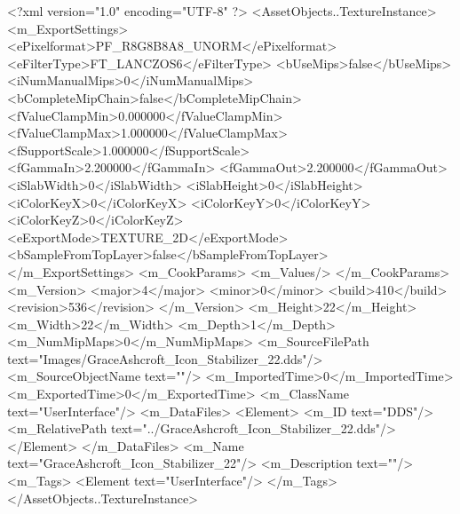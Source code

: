 <?xml version="1.0" encoding="UTF-8" ?>
<AssetObjects..TextureInstance>
	<m_ExportSettings>
		<ePixelformat>PF_R8G8B8A8_UNORM</ePixelformat>
		<eFilterType>FT_LANCZOS6</eFilterType>
		<bUseMips>false</bUseMips>
		<iNumManualMips>0</iNumManualMips>
		<bCompleteMipChain>false</bCompleteMipChain>
		<fValueClampMin>0.000000</fValueClampMin>
		<fValueClampMax>1.000000</fValueClampMax>
		<fSupportScale>1.000000</fSupportScale>
		<fGammaIn>2.200000</fGammaIn>
		<fGammaOut>2.200000</fGammaOut>
		<iSlabWidth>0</iSlabWidth>
		<iSlabHeight>0</iSlabHeight>
		<iColorKeyX>0</iColorKeyX>
		<iColorKeyY>0</iColorKeyY>
		<iColorKeyZ>0</iColorKeyZ>
		<eExportMode>TEXTURE_2D</eExportMode>
		<bSampleFromTopLayer>false</bSampleFromTopLayer>
	</m_ExportSettings>
	<m_CookParams>
		<m_Values/>
	</m_CookParams>
	<m_Version>
		<major>4</major>
		<minor>0</minor>
		<build>410</build>
		<revision>536</revision>
	</m_Version>
	<m_Height>22</m_Height>
	<m_Width>22</m_Width>
	<m_Depth>1</m_Depth>
	<m_NumMipMaps>0</m_NumMipMaps>
	<m_SourceFilePath text="Images/GraceAshcroft_Icon_Stabilizer_22.dds"/>
	<m_SourceObjectName text=""/>
	<m_ImportedTime>0</m_ImportedTime>
	<m_ExportedTime>0</m_ExportedTime>
	<m_ClassName text="UserInterface"/>
	<m_DataFiles>
		<Element>
			<m_ID text="DDS"/>
			<m_RelativePath text="../GraceAshcroft_Icon_Stabilizer_22.dds"/>
		</Element>
	</m_DataFiles>
	<m_Name text="GraceAshcroft_Icon_Stabilizer_22"/>
	<m_Description text=""/>
	<m_Tags>
		<Element text="UserInterface"/>
	</m_Tags>
</AssetObjects..TextureInstance>
